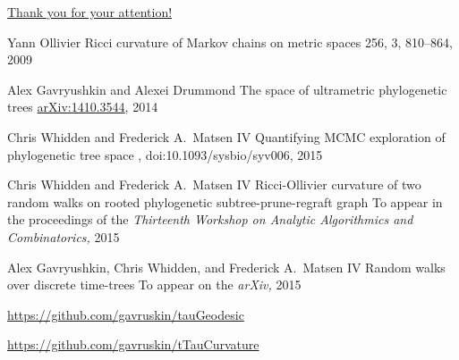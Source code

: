 \documentclass{beamer}
\theoremstyle{example}
\begin{document}
\begin{frame}{\href{http://alex.gavruskin.com/pictures/}{\Large{Thank
you for your attention!}}}


\scriptsize

Yann Ollivier
\newblock Ricci curvature of Markov chains on metric spaces
 256, 3, 810--864, 2009

Alex Gavryushkin and Alexei Drummond
\newblock The space of ultrametric phylogenetic trees
 \href{http://arxiv.org/abs/1410.3544}{arXiv:1410.3544}, 2014

Chris Whidden and Frederick A.\ Matsen IV
\newblock Quantifying MCMC exploration of phylogenetic tree space
, doi:10.1093/sysbio/syv006, 2015

Chris Whidden and Frederick A.\ Matsen IV
\newblock Ricci-Ollivier curvature of two random walks on rooted phylogenetic subtree-prune-regraft graph
\newblock To appear in the proceedings of the {\em Thirteenth Workshop on Analytic Algorithmics and Combinatorics,} 2015

Alex Gavryushkin, Chris Whidden, and Frederick A.\ Matsen IV
\newblock Random walks over discrete time-trees
\newblock To appear on the {\em arXiv,} 2015

\url{https://github.com/gavruskin/tauGeodesic}

\url{https://github.com/gavruskin/tTauCurvature}
\end{frame}
\end{document}
